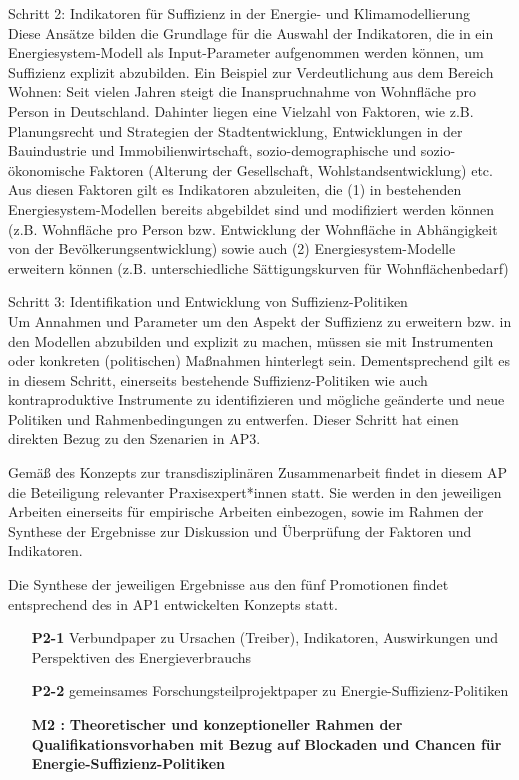 \documentclass[a4paper,11pt,twoside]{scrartcl}
\begin{document}
Schritt 2: Indikatoren für Suffizienz in der Energie- und Klimamodellierung\\
Diese Ansätze bilden die Grundlage für die Auswahl der Indikatoren, die in ein Energiesystem-Modell als Input-Parameter aufgenommen werden können, um Suffizienz explizit abzubilden.  
Ein Beispiel zur Verdeutlichung aus dem Bereich Wohnen: Seit vielen Jahren steigt die Inanspruchnahme von Wohnfläche pro Person in Deutschland. Dahinter liegen eine Vielzahl von Faktoren, wie z.B. Planungsrecht und Strategien der Stadtentwicklung, Entwicklungen in der Bauindustrie und Immobilienwirtschaft, sozio-demographische und sozio-ökonomische Faktoren (Alterung der Gesellschaft, Wohlstandsentwicklung) etc. 
Aus diesen Faktoren gilt es Indikatoren abzuleiten, die (1) in bestehenden Energiesystem-Modellen bereits abgebildet sind und modifiziert werden können (z.B. Wohnfläche pro Person bzw. Entwicklung der Wohnfläche in Abhängigkeit von der Bevölkerungsentwicklung) sowie auch (2) Energiesystem-Modelle erweitern können (z.B. unterschiedliche Sättigungskurven für Wohnflächenbedarf)

Schritt 3: Identifikation und Entwicklung von Suffizienz-Politiken \\
Um Annahmen und Parameter um den Aspekt der Suffizienz zu erweitern bzw. in den Modellen abzubilden und explizit zu machen, müssen sie mit Instrumenten oder konkreten (politischen) Maßnahmen hinterlegt sein. Dementsprechend gilt es in diesem Schritt, einerseits bestehende Suffizienz-Politiken wie auch kontraproduktive Instrumente zu identifizieren und mögliche geänderte und neue Politiken und Rahmenbedingungen zu entwerfen. Dieser Schritt hat einen direkten Bezug zu den Szenarien in AP3.

Gemäß des Konzepts zur transdisziplinären Zusammenarbeit findet in diesem AP die Beteiligung relevanter Praxisexpert*innen statt. Sie werden in den jeweiligen Arbeiten einerseits für empirische Arbeiten einbezogen, sowie im Rahmen der Synthese der Ergebnisse zur Diskussion und Überprüfung der Faktoren und Indikatoren.

Die Synthese der jeweiligen Ergebnisse aus den fünf Promotionen findet entsprechend des in AP1 entwickelten Konzepts statt.
\begin{itemize}
    \item[\textbf{P2-1}] Verbundpaper zu Ursachen (Treiber), Indikatoren, Auswirkungen und Perspektiven des Energieverbrauchs 
    \item[\textbf{P2-2}] gemeinsames Forschungsteilprojektpaper zu Energie-Suffizienz-Politiken 
    \item[\textbf{M2 :}] \textbf{Theoretischer und konzeptioneller Rahmen der Qualifikationsvorhaben mit Bezug auf Blockaden und Chancen für Energie-Suffizienz-Politiken}
\end{itemize}
\end{document}
